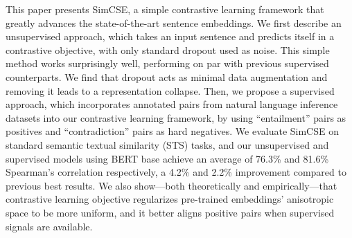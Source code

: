 This paper presents SimCSE, a simple contrastive learning framework that greatly advances the state-of-the-art sentence embeddings. We first describe an unsupervised approach, which takes an input sentence and predicts itself in a contrastive objective, with only standard dropout used as noise. This simple method works surprisingly well, performing on par with previous supervised counterparts. We find that dropout acts as minimal data augmentation and removing it leads to a representation collapse. Then, we propose a supervised approach, which incorporates annotated pairs from natural language inference datasets into our contrastive learning framework, by using ``entailment'' pairs as positives and ``contradiction'' pairs as hard negatives. We evaluate SimCSE on standard semantic textual similarity (STS) tasks, and our unsupervised and supervised models using BERT base achieve an average of 76.3\% and 81.6\% Spearman's correlation respectively, a 4.2\% and 2.2\% improvement compared to previous best results. We also show---both theoretically and empirically---that contrastive learning objective regularizes pre-trained embeddings' anisotropic space to be more uniform, and it better aligns positive pairs when supervised signals are available.
